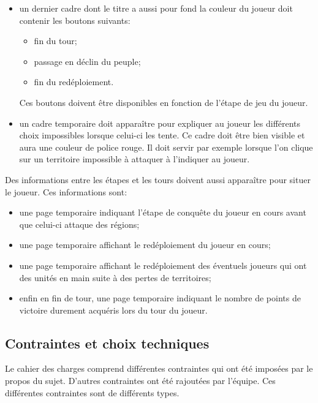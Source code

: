 \documentclass[a4paper, 11pt]{article}
\begin{document}
\begin{itemize}
				\item un dernier cadre dont le titre a aussi pour fond la couleur du joueur doit contenir les boutons suivants:
				\begin{itemize}
					\item fin du tour;
					\item passage en déclin du peuple;
					\item fin du redéploiement.
				\end{itemize}
				Ces boutons doivent être disponibles en fonction de l'étape de jeu du joueur. \\
				
				\item un cadre temporaire doit apparaître pour expliquer au joueur les différents choix impossibles lorsque celui-ci les tente. Ce cadre doit être bien visible et aura une couleur de police rouge. Il doit servir par exemple lorsque l'on clique sur un territoire impossible à attaquer à l'indiquer au joueur. \\
			\end{itemize}
			
			Des informations entre les étapes et les tours doivent aussi apparaître pour situer le joueur. Ces informations sont:
			\begin{itemize}
				\item une page temporaire indiquant l'étape de conquête du joueur en cours avant que celui-ci attaque des régions;
				\item une page temporaire affichant le redéploiement du joueur en cours;
				\item une page temporaire affichant le redéploiement des éventuels joueurs qui ont des unités en main suite à des pertes de territoires;
				\item enfin en fin de tour, une page temporaire indiquant le nombre de points de victoire durement acquéris lors du tour du joueur.
			\end{itemize}
			
		\subsection{Contraintes et choix techniques}
		
		Le cahier des charges comprend différentes contraintes qui ont été imposées par le propos du sujet. D'autres contraintes ont été rajoutées par l'équipe. Ces différentes contraintes sont de différents types. \\
		
\end{document}
